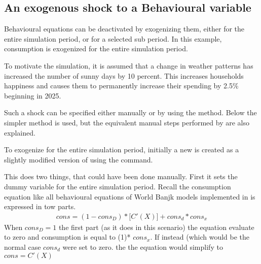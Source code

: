 \documentclass[letterpaper,10pt,english]{jupyterBook}
\begin{document}
\subsection{An exogenous shock to a Behavioural variable}
\label{\detokenize{content/05_WBModels/ScenarioAnalysis:an-exogenous-shock-to-a-behavioural-variable}}
\sphinxAtStartPar
Behavioural equations can be de\sphinxhyphen{}activated by exogenizing them, either for the entire simulation period, or for a selected sub period.  In this example, consumption is exogenized for the entire simulation period.

\sphinxAtStartPar
To motivate the simulation, it is assumed that a change in weather patterns has increased the number of sunny days by 10 percent. This increases households happiness and causes them to permanently increase their spending by 2.5\% beginning in 2025.

\sphinxAtStartPar
Such a shock can be specified either manually or by using the method. Below the simpler  method is used, but the equivalent manual steps performed by  are also explained.

\sphinxAtStartPar
To exogenize  for the entire simulation period, initially a new   is created as a slightly modified version of   using the  command.

\sphinxAtStartPar
{}

\sphinxAtStartPar
This does two things, that could have been done manually.  First it sets the dummy variable  for the entire simulation period. Recall the consumption equation like all behavioural equations of World Banjk models implemented in is expressed in tow parts.
\begin{equation*}
\begin{split} cons= (1-cons_D)*\bigg[C'(X)\bigg] + cons_d*cons_x\end{split}
\end{equation*}
\sphinxAtStartPar
When \(cons_D=1\) the first part (as it does in this scenario) the equation evaluate to zero and consumption is equal to (1)* \(cons_x\).  If instead (which would be the normal case \(cons_d\) were set to zero. the the equation would simplify to \( cons= C'(X) \)
\end{document}
